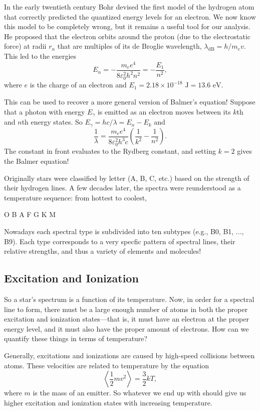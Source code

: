 \documentclass[../a062main.tex]{subfiles}
\begin{document}
In the early twentieth century Bohr devised the first model of the hydrogen atom that correctly predicted the quantized energy levels for an electron.
We now know this model to be completely wrong, but it remains a useful tool for our analysis.
He proposed that the electron orbits around the proton (due to the electrostatic force) at radii $r_n$ that are multiples of its de Broglie wavelength, $\lambda_\textrm{dB} = h / m_e v$.
This led to the energies
\[ \boxed{E_n = -\frac{m_e e^{4}}{8 \varepsilon_0^2 h^2 n^2} = -\frac{E_1}{n^2}}, \]
where $e$ is the charge of an electron and $E_1 = 2.18 \times 10^{-18} \textrm{ J} = 13.6 \textrm{ eV}$.

This can be used to recover a more general version of Balmer's equation!
Suppose that a photon with energy $E_\gamma$ is emitted as an electron moves between its $k$th and $n$th energy states.
So $E_\gamma = hc / \lambda = E_n - E_k$ and
\[ \frac{1}{\lambda} = \frac{m_e e^{4}}{8 \varepsilon_0^2 h^3 c} \left( \frac{1}{k^2} - \frac{1}{n^2} \right). \]
The constant in front evaluates to the Rydberg constant, and setting $k=2$ gives the Balmer equation!

Originally stars were classified by letter (A, B, C, etc.) based on the strength of their hydrogen lines.
A few decades later, the spectra were reunderstood as a temperature sequence: from hottest to coolest,
\begin{center}
    O B A F G K M
\end{center}
Nowadays each spectral type is subdivided into ten subtypes (e.g., B0, B1, ..., B9).
Each type corresponds to a very specfic pattern of spectral lines, their relative strengths, and thus a variety of elements and molecules!

\subsection*{Excitation and Ionization}
So a star's spectrum is a function of its temperature.
Now, in order for a spectral line to form, there must be a large enough number of atoms in both the proper excitation and ionization states---that is, it must have an electron at the proper energy level, and it must also have the proper amount of electrons.
How can we quantify these things in terms of temperature?

Generally, excitations and ionizations are caused by high-speed collisions between atoms.
These velocities are related to temperature by the equation
\[ \left< \frac{1}{2}mv^2 \right> = \frac{3}{2} kT, \]
where $m$ is the mass of an emitter.
So whatever we end up with should give us higher excitation and ionization states with increasing temperature.
\end{document}
